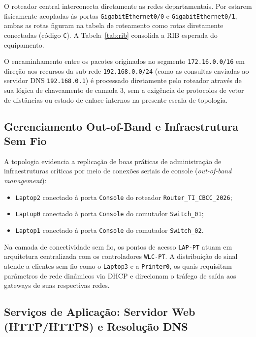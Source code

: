 O roteador central interconecta diretamente as redes departamentais. Por estarem fisicamente acopladas às portas \texttt{GigabitEthernet0/0} e \texttt{GigabitEthernet0/1}, ambas as rotas figuram na tabela de roteamento como rotas diretamente conectadas (código \texttt{C}). A Tabela~\ref{tab:rib} consolida a RIB esperada do equipamento.

\begin{table}[H]
\centering
\small

\caption{Tabela de encaminhamento (RIB) do roteador central.}
\label{tab:rib}
\end{table}

O encaminhamento entre os pacotes originados no segmento \texttt{172.16.0.0/16} em direção aos recursos da sub-rede \texttt{192.168.0.0/24} (como as consultas enviadas ao servidor DNS \texttt{192.168.0.1}) é processado diretamente pelo roteador através de sua lógica de chaveamento de camada 3, sem a exigência de protocolos de vetor de distâncias ou estado de enlace internos na presente escala de topologia.

\subsection{Gerenciamento Out-of-Band e Infraestrutura Sem Fio}

A topologia evidencia a replicação de boas práticas de administração de infraestruturas críticas por meio de conexões seriais de console (\textit{out-of-band management}):
\begin{itemize}[leftmargin=2em]
  \item \texttt{Laptop2} conectado à porta \texttt{Console} do roteador \texttt{Router\_TI\_CBCC\_2026};
  \item \texttt{Laptop0} conectado à porta \texttt{Console} do comutador \texttt{Switch\_01};
  \item \texttt{Laptop1} conectado à porta \texttt{Console} do comutador \texttt{Switch\_02}.
\end{itemize}

Na camada de conectividade sem fio, os pontos de acesso \texttt{LAP-PT} atuam em arquitetura centralizada com os controladores \texttt{WLC-PT}. A distribuição de sinal atende a clientes sem fio como o \texttt{Laptop3} e a \texttt{Printer0}, os quais requisitam parâmetros de rede dinâmicos via DHCP e direcionam o tráfego de saída aos gateways de suas respectivas redes.

\subsection{Serviços de Aplicação: Servidor Web (HTTP/HTTPS) e Resolução DNS}

